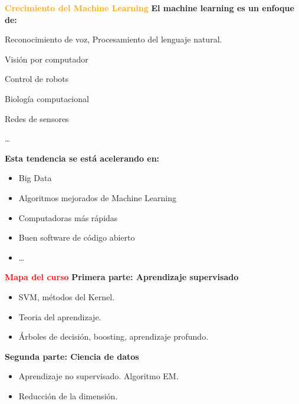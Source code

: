 \documentclass[11pt]{beamer}
\begin{document}
\begin{frame}{\textbf{\textcolor{orange}{Crecimiento del Machine Learning}}}
\textbf{El machine learning es un enfoque de:}
\begin{itemize}
	\small{
	\item Reconocimiento de voz, Procesamiento del lenguaje natural.
	\item  Visi\'on por computador
	\item Control de robots
	\item Biolog\'ia computacional
	\item Redes de sensores
	\item \dots
}
\end{itemize}

\textbf{Esta tendencia se est\'a acelerando en:}
\small{
\begin{itemize}
	\item Big Data
	\item Algoritmos mejorados de Machine Learning
	\item Computadoras m\'as r\'apidas
	\item Buen software de c\'odigo abierto
	\item \dots
\end{itemize}
}
\end{frame}

\begin{frame}{\textbf{\textcolor{red}{Mapa del curso}}}
\textbf{Primera parte: Aprendizaje supervisado}

\begin{itemize}
	\item SVM, m\'etodos del Kernel.
	\item Teoria del aprendizaje.
	\item \'Arboles de decisi\'on, boosting, aprendizaje profundo.
\end{itemize}
\textbf{Segunda parte: Ciencia de datos}
\begin{itemize}
	\item Aprendizaje no supervisado. Algoritmo EM.
	\item Reducci\'on de la dimensi\'on.
\end{itemize}
\end{frame}
\end{document}
